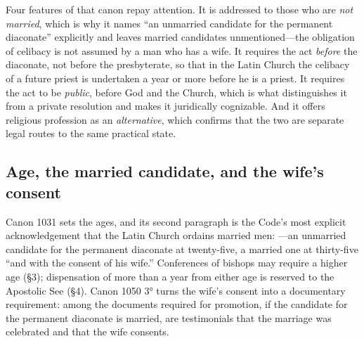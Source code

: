 Four features of that canon repay attention. It is addressed to those who are \emph{not married}, which is why it names ``an unmarried candidate for the permanent diaconate'' explicitly and leaves married candidates unmentioned---the obligation of celibacy is not assumed by a man who has a wife. It requires the act \emph{before} the diaconate, not before the presbyterate, so that in the Latin Church the celibacy of a future priest is undertaken a year or more before he is a priest. It requires the act to be \emph{public}, before God and the Church, which is what distinguishes it from a private resolution and makes it juridically cognizable. And it offers religious profession as an \emph{alternative}, which confirms that the two are separate legal routes to the same practical state.

\subsection{Age, the married candidate, and the wife's consent}

Canon 1031 sets the ages, and its second paragraph is the Code's most explicit acknowledgement that the Latin Church ordains married men: ---an unmarried candidate for the permanent diaconate at twenty-five, a married one at thirty-five ``and with the consent of his wife.'' Conferences of bishops may require a higher age (§3); dispensation of more than a year from either age is reserved to the Apostolic See (§4). Canon 1050 3° turns the wife's consent into a documentary requirement: among the documents required for promotion, if the candidate for the permanent diaconate is married, are testimonials that the marriage was celebrated and that the wife consents.

